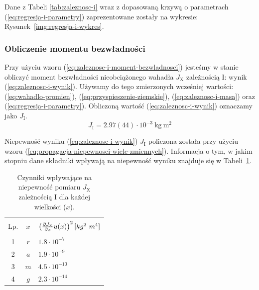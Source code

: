 \documentclass[twocolumn, a4paper, polish, 10pt]{article}
\newcommand{\JX}{\ensuremath{ J_{\mathrm{X}} }}
\newcommand{\JXn}[1]{\ensuremath{ J_{\mathrm{#1}} }}
\begin{document}
Dane z Tabeli \ref{tab:zaleznosc-i} wraz z dopasowaną krzywą o parametrach (\ref{eq:regresja-i-parametry}) zaprezentowane zostały na wykresie: Rysunek~\ref{img:regresja-i-wykres}.


\subsubsection{Obliczenie momentu bezwładności}
Przy użyciu wzoru (\ref{eq:zaleznosc-i-moment-bezwladnosci}) jesteśmy w stanie obliczyć moment bezwładności nieobciążonego wahadła $\JX$ zależnością I: wynik (\ref{eq:zaleznosc-i-wynik}). Używamy do tego zmierzonych wcześniej wartości: (\ref{eq:wahadlo-promien}), (\ref{eq:przyspieszenie-ziemskie}), (\ref{eq:zaleznosc-i-masa}) oraz (\ref{eq:regresja-i-parametry}). Obliczoną wartość (\ref{eq:zaleznosc-i-wynik}) oznaczamy jako $\JXn{I}$.
\begin{equation}
    \JXn{I} = 2.97(44) \cdot 10^{-3}~\mathrm{kg~m^2}
    \label{eq:zaleznosc-i-wynik}
\end{equation}

Niepewność wyniku (\ref{eq:zaleznosc-i-wynik}) $\JXn{I}$ policzona została przy użyciu wzoru (\ref{eq:propagacja-niepewnosci-wiele-zmiennych}). Informacja o tym, w jakim stopniu dane składniki wpływają na niepewność wyniku znajduje się w Tabeli~\ref{tab:zaleznosc-i-niepewnosci}.
\begin{table}[ht]
\begin{center}
\renewcommand*{\tablename}{Tabela}
\caption{\small Czynniki wpływające na niepewność pomiaru $\JX$ zależnością I dla każdej wielkości ($x$).\vspace{0.15cm}
    \label{tab:zaleznosc-i-niepewnosci}}
    {\small
    \begin{tabular}{c c l}
    \hline \vspace{-0.35cm} \\
      Lp. & $x$
      & $\left( \pdv{\JX}{x} u(x) \right)^2 [kg^2~m^4]$ \\ 
      \hline \vspace{-0.2cm} \\
     1 & $r$ & $1.8 \cdot 10^{-7}$ \\
     2 & $a$ & $1.9 \cdot 10^{-9}$ \\
     3 & $m$ & $4.5 \cdot 10^{-10}$ \\
     4 & $g$ & $2.3 \cdot 10^{-14}$ \\
    \hline
    \end{tabular}}
    \end{center}
\end{table}
\end{document}
